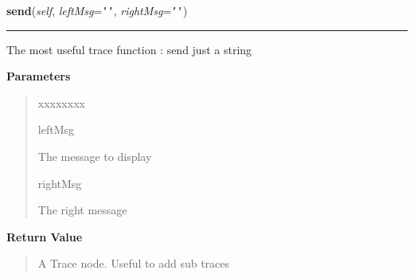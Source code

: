 \hspace{.8\funcindent}\begin{boxedminipage}{\funcwidth}

    \raggedright \textbf{send}(\textit{self}, \textit{leftMsg}={\tt \texttt{'}\texttt{}\texttt{'}}, \textit{rightMsg}={\tt \texttt{'}\texttt{}\texttt{'}})

    \vspace{-1.5ex}

    \rule{\textwidth}{0.5\fboxrule}
\setlength{\parskip}{2ex}
    The most useful trace function : send just a string

\setlength{\parskip}{1ex}
      \textbf{Parameters}
      \vspace{-1ex}

      \begin{quote}
        \begin{Ventry}{xxxxxxxx}

          \item[leftMsg]

          The message to display

          \item[rightMsg]

          The right message

        \end{Ventry}

      \end{quote}

      \textbf{Return Value}
    \vspace{-1ex}

      \begin{quote}
      A Trace node. Useful to add sub traces

      \end{quote}

    \end{boxedminipage}

    \label{tracetool:TraceToSend:sendValue}

    \vspace{0.5ex}

